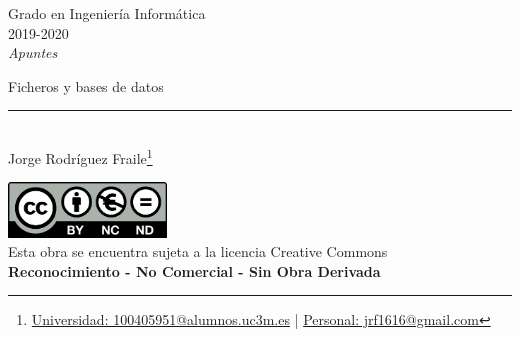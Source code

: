 \documentclass[12pt, twoside, openright]{report} %
\begin{document}
	
\begin{titlepage}
	\begin{sffamily}
	\color{azulUC3M}
	\begin{center}
		\begin{figure}[H] %
		\end{figure}
		\vspace{2.5cm}
		\begin{Large}
			Grado en Ingeniería Informática\\			
			2019-2020\\
			\vspace{2cm}		
			\textsl{Apuntes}\\
			\bigskip
		\end{Large}
		 	{\Huge Ficheros y bases de datos}\\
		 	\vspace*{0.5cm}
	 		\rule{10.5cm}{0.1mm}\\
			\vspace*{0.9cm}
			{\LARGE Jorge Rodríguez Fraile\footnote{\href{mailto:100405951@alumnos.uc3m.es}{Universidad: 100405951@alumnos.uc3m.es}  |  \href{mailto:jrf1616@gmail.com}{Personal: jrf1616@gmail.com}}}\\ 
			\vspace*{1cm}
	\end{center}
	\vfill
	\color{black}
		\includegraphics[width=4.2cm]{img/creativecommons.png}\\
		Esta obra se encuentra sujeta a la licencia Creative Commons\\ \textbf{Reconocimiento - No Comercial - Sin Obra Derivada}
	\end{sffamily}
\end{titlepage}


\tableofcontents
\thispagestyle{fancy}
\end{document}
